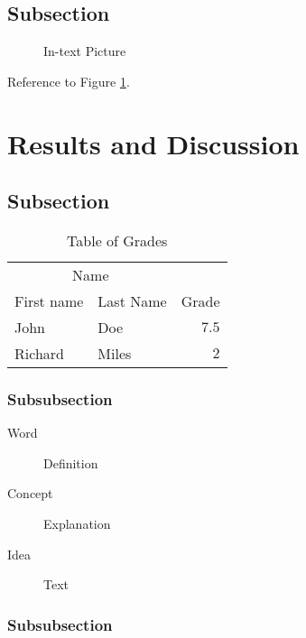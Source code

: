 \documentclass[fleqn,10pt]{SelfArx} %
\begin{document}
\subsection{Subsection}

\lipsum[9] %

\begin{figure}[ht]\centering
\caption{In-text Picture}
\label{fig:results}
\end{figure}

Reference to Figure \ref{fig:results}.


\section{Results and Discussion}

\lipsum[10] %

\subsection{Subsection}

\lipsum[11] %

\begin{table}[hbt]
\caption{Table of Grades}
\centering
\begin{tabular}{llr}
\toprule
\multicolumn{2}{c}{Name} \\
\cmidrule(r){1-2}
First name & Last Name & Grade \\
\midrule
John & Doe & $7.5$ \\
Richard & Miles & $2$ \\
\bottomrule
\end{tabular}
\label{tab:label}
\end{table}

\subsubsection{Subsubsection}

\lipsum[12] %

\begin{description}
\item[Word] Definition
\item[Concept] Explanation
\item[Idea] Text
\end{description}

\subsubsection{Subsubsection}
\end{document}
